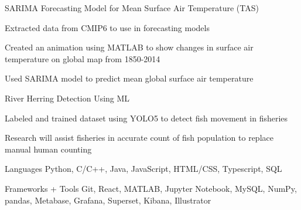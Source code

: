 \documentclass[12pt, letterpaper]{awesome-cv}
\begin{document}
\begin{cventries}
  \cventry
    {} %
    {SARIMA Forecasting Model for Mean Surface Air Temperature (TAS)} %
    {} %
    {} %
    {
      \vspace{-0.2in}
      \begin{cvitems} %
        \item {Extracted data from CMIP6 to use in forecasting models}
        \item {Created an animation using MATLAB to show changes in surface air temperature on global map from 1850-2014}
        \item {Used SARIMA model to predict mean global surface air temperature}
      \end{cvitems}
    }

  \cventry
    {} %
    {River Herring Detection Using ML} %
    {} %
    {} %
    {
      \vspace{-0.25in}
      \begin{cvitems} %
        \item {Labeled and trained dataset using YOLO5 to detect fish movement in fisheries}
        \item {Research will assist fisheries in accurate count of fish population to replace manual human counting}
      \end{cvitems}
    }
\end{cventries}

\begin{cvskills}
  \cvskill
    {Languages} %
    {Python, C/C++, Java, JavaScript, HTML/CSS, Typescript, SQL} %

  \cvskill
    {Frameworks + Tools} %
    {Git, React, MATLAB, Jupyter Notebook, MySQL, NumPy, pandas, Metabase, Grafana, Superset, Kibana, Illustrator} %
  
    
\end{cvskills}

\end{document}
